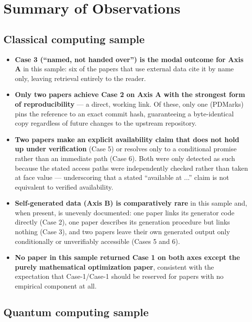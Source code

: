 \documentclass[11pt]{article}
\begin{document}
\section{Summary of Observations}

\subsection{Classical computing sample}

\begin{itemize}[leftmargin=1.5em]
    \item \textbf{Case 3 (``named, not handed over'') is the modal outcome for Axis
    A} in this sample: six of the papers that use external data cite it by name only,
    leaving retrieval entirely to the reader.
    \item \textbf{Only two papers achieve Case 2 on Axis A with the strongest form of
    reproducibility} --- a direct, working link. Of these, only one (PDMarks) pins the
    reference to an exact commit hash, guaranteeing a byte-identical copy regardless of
    future changes to the upstream repository.
    \item \textbf{Two papers make an explicit availability claim that does not hold up
    under verification} (Case 5) or resolves only to a conditional promise rather than
    an immediate path (Case 6). Both were only detected as such because the stated
    access paths were independently checked rather than taken at face value ---
    underscoring that a stated ``available at ...'' claim is not equivalent to verified
    availability.
    \item \textbf{Self-generated data (Axis B) is comparatively rare} in this sample
    and, when present, is unevenly documented: one paper links its generator code
    directly (Case 2), one paper describes its generation procedure but links nothing
    (Case 3), and two papers leave their own generated output only conditionally or
    unverifiably accessible (Cases 5 and 6).
    \item \textbf{No paper in this sample returned Case 1 on both axes except the
    purely mathematical optimization paper}, consistent with the expectation that
    Case-1/Case-1 should be reserved for papers with no empirical component at all.
\end{itemize}

\subsection{Quantum computing sample}
\end{document}
